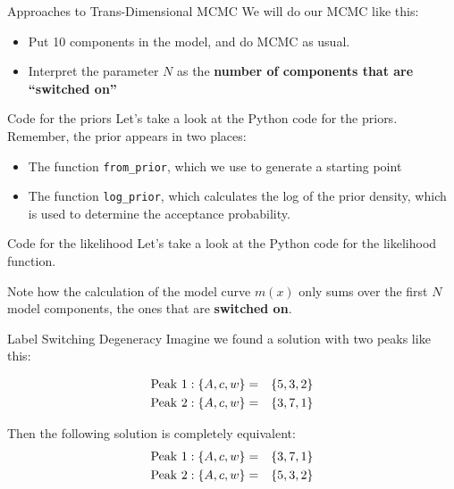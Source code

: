 \begin{frame}[t]{Approaches to Trans-Dimensional MCMC}
We will do our MCMC like this:

\begin{itemize}
\item Put 10 components in the model, and do MCMC as usual.
\item Interpret the parameter $N$ as the {\bf number of components that are ``switched on''}
\end{itemize}

\end{frame}


\begin{frame}[t]{Code for the priors}
Let's take a look at the Python code for the priors. Remember, the prior
appears in two places:

\begin{itemize}
\item The function {\tt from\_prior}, which we use to generate a starting point
\item The function {\tt log\_prior}, which calculates the log of the prior
density, which is used to determine the acceptance probability.
\end{itemize}
\end{frame}


\begin{frame}[t]{Code for the likelihood}
Let's take a look at the Python code for the likelihood function.\\

\vspace{20pt}

Note how the calculation of the model curve $m(x)$ only sums over the first
$N$ model components, the ones that are {\bf switched on}.

\end{frame}

\begin{frame}[t]{Label Switching Degeneracy}
Imagine we found a solution with two peaks like this:

\begin{eqnarray*}
\textnormal{Peak 1}: \{A, c, w\} &=& \{5, 3, 2\}\\
\textnormal{Peak 2}: \{A, c, w\} &=& \{3, 7, 1\}
\end{eqnarray*}

Then the following solution is completely equivalent:
\begin{eqnarray*}
\textnormal{Peak 1}: \{A, c, w\} &=& \{3, 7, 1\}\\
\textnormal{Peak 2}: \{A, c, w\} &=& \{5, 3, 2\}
\end{eqnarray*}

\end{frame}

